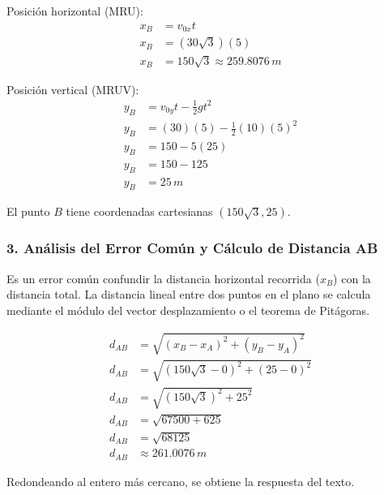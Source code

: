 \documentclass[12pt, a4paper]{article}
\begin{document}
Posición horizontal (MRU):
\begin{align*}
x_B &= v_{0x} t \\
x_B &= (30\sqrt{3})(5) \\
x_B &= 150\sqrt{3} \approx 259.8076 \, \si{m}
\end{align*}

Posición vertical (MRUV):
\begin{align*}
y_B &= v_{0y} t - \frac{1}{2} g t^2 \\
y_B &= (30)(5) - \frac{1}{2}(10)(5)^2 \\
y_B &= 150 - 5(25) \\
y_B &= 150 - 125 \\
y_B &= 25 \, \si{m}
\end{align*}

El punto $B$ tiene coordenadas cartesianas $(150\sqrt{3}, 25)$.

\subsubsection*{3. Análisis del Error Común y Cálculo de Distancia AB}
Es un error común confundir la distancia horizontal recorrida ($x_B$) con la distancia total. La distancia lineal entre dos puntos en el plano se calcula mediante el módulo del vector desplazamiento o el teorema de Pitágoras.

\begin{align*}
d_{AB} &= \sqrt{(x_B - x_A)^2 + (y_B - y_A)^2} \\
d_{AB} &= \sqrt{(150\sqrt{3} - 0)^2 + (25 - 0)^2} \\
d_{AB} &= \sqrt{(150\sqrt{3})^2 + 25^2} \\
d_{AB} &= \sqrt{67500 + 625} \\
d_{AB} &= \sqrt{68125} \\
d_{AB} &\approx 261.0076 \, \si{m}
\end{align*}

Redondeando al entero más cercano, se obtiene la respuesta del texto.
\end{document}
